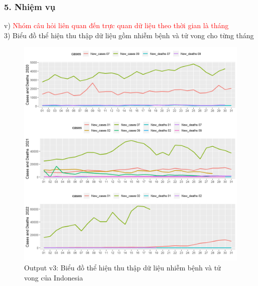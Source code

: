 \documentclass[english,10pt,table]{beamer}
\begin{document}
\begin{frame}[fragile]
\frametitle{5.  Nhiệm vụ}
v) \textcolor{red}{Nhóm câu hỏi liên quan đến trực quan dữ liệu theo thời gian là tháng}\\
    3) Biểu đồ thể hiện thu thập dữ liệu gồm nhiễm bệnh và tử vong cho từng tháng
	\begin{figure}[h!]
	\begin{center}
		    \includegraphics[scale = 0.25]{Images/V/v3 Indonesia .jpeg}
		     \caption{Output v3: Biểu đồ thể hiện thu thập dữ liệu nhiễm bệnh và tử vong của Indonesia}
		\end{center}
		\end{figure}
\end{frame}
\end{document}
